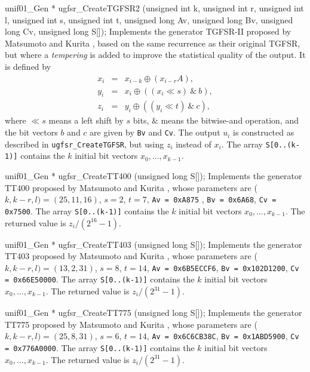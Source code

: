 unif01_Gen * ugfsr_CreateTGFSR2 (unsigned int k, unsigned int r,
                                 unsigned int l, unsigned int s,
                                 unsigned int t, unsigned long Av, 
                                 unsigned long Bv, unsigned long Cv, 
                                 unsigned long S[]);
\endcode
  \tab Implements the generator TGFSR-II proposed by
   Matsumoto and Kurita \cite{rMAT94a}, based on the same recurrence
   as their original TGFSR, but where a {\em tempering\/} is
   added to improve the statistical quality of the output.
   It is defined by
   \begin {eqnarray}
    x_i &=& x_{i-k} \oplus (x_{i-r}A),              \label {tgfsr2a} \\
    y_i &=& x_i \oplus ((x_i \ll s)\ \&\ b),          \label {tgfsr2b} \\
    z_i &=& y_i \oplus ((y_i \ll t)\ \&\ c),          \label {tgfsr2c}
   \end {eqnarray}
   where $\ll s$ means a left shift by $s$ bits,
   $\&$ means the bitwise-and operation, and the bit vectors
   $b$ and $c$ are given by {\tt Bv} and {\tt Cv}.
   The output $u_i$ is constructed as described in {\tt ugfsr\_CreateTGFSR},
   but using $z_i$ instead of $x_i$.
   The array {\tt S[0..(k-1)]} contains the $k$ initial bit vectors
   $x_0, \dots, x_{k-1}$.
  \endtab
\code


unif01_Gen * ugfsr_CreateTT400 (unsigned long S[]);
\endcode
  \tab Implements the generator TT400  proposed by
%
   Matsumoto and Kurita \cite{rMAT94a}, whose parameters are
   ($k,k-r,l) = (25,11,16)$,  $s = 2$, $t = 7$,  
   {\tt Av = 0xA875} , {\tt Bv = 0x6A68}, {\tt Cv = 0x7500}.
   The array {\tt S[0..(k-1)]} contains the $k$ initial bit vectors
   $x_0, \dots, x_{k-1}$.   The returned value is $z_i/(2^{16} - 1)$.
  \endtab
\code


unif01_Gen * ugfsr_CreateTT403 (unsigned long S[]);
\endcode
  \tab Implements the generator TT403  proposed by
%
   Matsumoto and Kurita \cite{rMAT94a},  whose parameters are
   ($k,k-r,l) = (13,2,31)$,  $s = 8$, $t = 14$,
   {\tt Av = 0x6B5ECCF6}, {\tt Bv = 0x102D1200}, {\tt Cv = 0x66E50000}.
   The array {\tt S[0..(k-1)]} contains the $k$ initial bit vectors
   $x_0, \dots, x_{k-1}$.
   The returned value is $z_i/(2^{31} - 1)$. 
  \endtab
\code


unif01_Gen * ugfsr_CreateTT775 (unsigned long S[]);
\endcode
  \tab Implements the generator TT775  proposed by
%
   Matsumoto and Kurita \cite{rMAT94a},  whose parameters are
   ($k,k-r,l) = (25,8,31)$,  $s = 6$, $t = 14$, {\tt Av = 0x6C6CB38C}, 
   {\tt Bv = 0x1ABD5900}, {\tt Cv = 0x776A0000}.   
   The array {\tt S[0..(k-1)]} contains the $k$ initial bit vectors
   $x_0, \dots, x_{k-1}$.  The returned value is $z_i/(2^{31} - 1)$. 
  \endtab
\code


